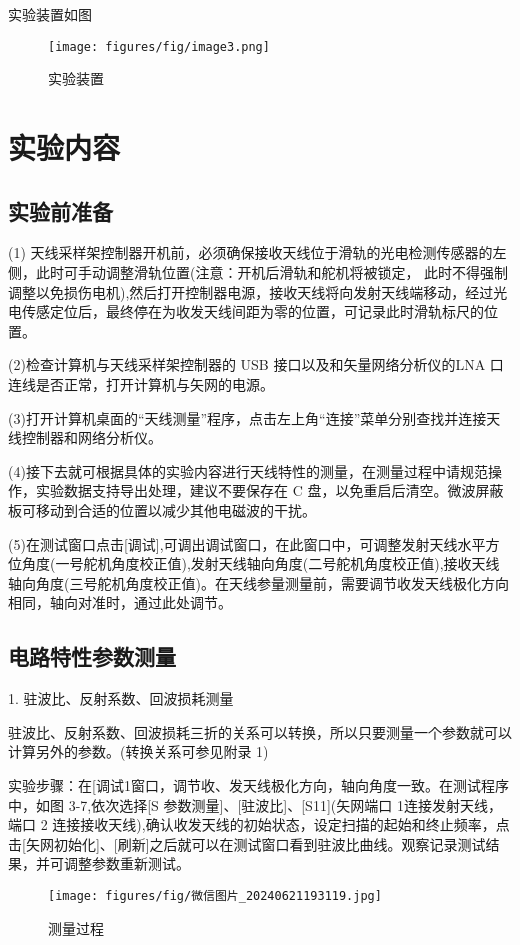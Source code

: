 \documentclass[12pt,hyperref,a4paper,UTF8]{ctexart}
\begin{document}
实验装置如图
\begin{figure}[h]
    \centering
    \texttt{[image: figures/fig/image3.png]}
    \caption{实验装置}
\end{figure}





\section{实验内容}
\subsection*{实验前准备}

(1) 天线采样架控制器开机前，必须确保接收天线位于滑轨的光电检测传感器的左侧，此时可手动调整滑轨位置(注意：开机后滑轨和舵机将被锁定，
此时不得强制调整以免损伤电机),然后打开控制器电源，接收天线将向发射天线端移动，经过光电传感定位后，最终停在为收发天线间距为零的位置，可记录此时滑轨标尺的位置。

(2)检查计算机与天线采样架控制器的 USB 接口以及和矢量网络分析仪的LNA 口连线是否正常，打开计算机与矢网的电源。

(3)打开计算机桌面的“天线测量”程序，点击左上角“连接”菜单分别查找并连接天线控制器和网络分析仪。

(4)接下去就可根据具体的实验内容进行天线特性的测量，在测量过程中请规范操作，实验数据支持导出处理，建议不要保存在 C 盘，以免重启后清空。微波屏蔽板可移动到合适的位置以减少其他电磁波的干扰。

(5)在测试窗口点击[调试],可调出调试窗口，在此窗口中，可调整发射天线水平方位角度(一号舵机角度校正值),发射天线轴向角度(二号舵机角度校正值),接收天线轴向角度(三号舵机角度校正值)。在天线参量测量前，需要调节收发天线极化方向相同，轴向对准时，通过此处调节。

\subsection{电路特性参数测量}

1. 驻波比、反射系数、回波损耗测量

驻波比、反射系数、回波损耗三折的关系可以转换，所以只要测量一个参数就可以计算另外的参数。(转换关系可参见附录 1)

实验步骤：在[调试1窗口，调节收、发天线极化方向，轴向角度一致。在测试程序中，如图 3-7,依次选择[S 参数测量]、[驻波比]、[S11](矢网端口 1连接发射天线，端口 2 连接接收天线),确认收发天线的初始状态，设定扫描的起始和终止频率，点击[矢网初始化]、[刷新]之后就可以在测试窗口看到驻波比曲线。观察记录测试结果，并可调整参数重新测试。
\begin{figure}[H]
    \centering
    \texttt{[image: figures/fig/微信图片\_20240621193119.jpg]}
    \caption{测量过程}
\end{figure}
\end{document}
